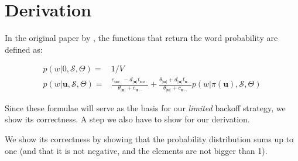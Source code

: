 \section{Derivation}

In the original paper by \citep{Teh2006AHierarchical}, the functions that return the word probability are defined as:

\begin{equation}
\begin{split}
p(w | 0, \mathcal{S}, \Theta) =& 1/V \\
p(w | \mathbf{u}, \mathcal{S}, \Theta) =& \frac{c_{\mathbf{u}w\cdot} - d_{|\mathbf{u}|}t_{\mathbf{u}w\cdot}}{\theta_{|\mathbf{u}|}+c_{\mathbf{u}\cdot\cdot}} + \frac{\theta_{|\mathbf{u}|} + d_{|\mathbf{u}|}t_{\mathbf{u}\cdot\cdot}}{\theta_{|\mathbf{u}|}+c_{\mathbf{u}\cdot\cdot}} p(w | \pi(\mathbf{u}), \mathcal{S}, \Theta)
\end{split}
\end{equation}

Since these formulae will serve as the basis for our \textsl{limited} backoff strategy, we show its correctness. A step we also have to show for our derivation.

We show its correctness by showing that the probability distribution sums up to one (and that it is not negative, and the elements are not bigger than 1).

